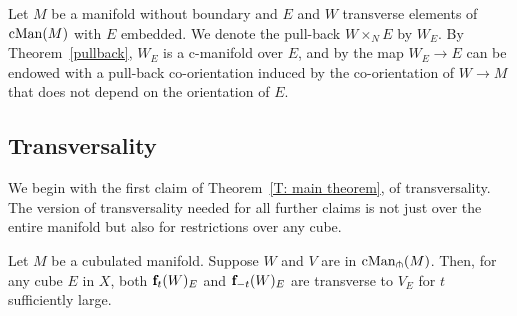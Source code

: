 \begin{definition}
	Let $M$ be a manifold without boundary and $E$ and $W$ transverse elements of $\mathrm{cMan}(M)$ with $E$ embedded.
	We denote the pull-back $W \times_N E$ by $W_E$. By Theorem~\ref{pullback}, $W_E$ is a c-manifold over $E$, and by \cite{FMS-foundations} the map $W_E\to E$ can be endowed with a pull-back co-orientation induced by the co-orientation of $W\to M$ that does not depend on the orientation of $E$.
\end{definition}

\subsection{Transversality}

We begin with the first claim of Theorem~\ref{T: main theorem}, of transversality. The version of transversality needed for all further claims 
is not just over the entire manifold but also for restrictions over any cube.

\begin{theorem} \label{T: transversality}
	Let $M$ be a cubulated manifold.
	Suppose $W$ and $V$ are in $\mathrm{cMan}_\pitchfork(M)$.
	Then, for any cube $E$ in $X$, both $\mathbf{f}_t(W)_E$ and $\mathbf{f}_{-t}(W)_E$ are transverse to $V_E$ for $t$ sufficiently large.
\end{theorem}

